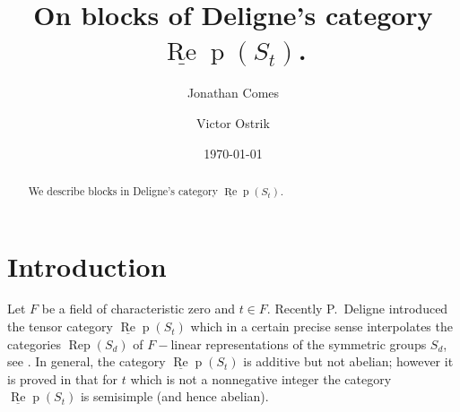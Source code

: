 \documentclass{amsart}
\theoremstyle{definition}
\def\uRep{\underline{\operatorname{Re}}\!\operatorname{p}}
\newcommand{\Rep}{\operatorname{Rep}}
\renewcommand{\1}{_{(1)}}
\renewcommand{\2}{_{(2)}}
\newcommand{\3}{_{(3)}}
\newcommand{\4}{_{(4)}}
\begin{document}
\title{On blocks of Deligne's category $\uRep(S_t)$.}

\author{Jonathan Comes}
\address{J.C.: Technische Universit\"{a}t M\"{u}nchen,
Zentrum Mathematik, 85748 Garching, Germany}


\author{Victor Ostrik}
\address{V.O.: Department of Mathematics,
University of Oregon, Eugene, OR 97403, USA}



\begin{abstract}
We describe blocks in Deligne's category $\uRep(S_t)$.
\end{abstract}

\date{\today}
\maketitle  

\section{Introduction}

Let $F$ be a field of characteristic zero and $t\in F$. 
Recently P.~Deligne introduced the tensor category $\uRep(S_t)$ which in a certain precise
sense interpolates the categories $\Rep(S_d)$ of $F-$linear representations  of the symmetric 
groups $S_d$, see \cite{Del07}. In general, the category $\uRep(S_t)$ is additive but not abelian; 
however it is proved in
\cite[Th\'eor\`eme 2.18]{Del07} that for $t$ which is not a nonnegative integer the category $\uRep(S_t)$
is semisimple (and hence abelian). 
\end{document}
